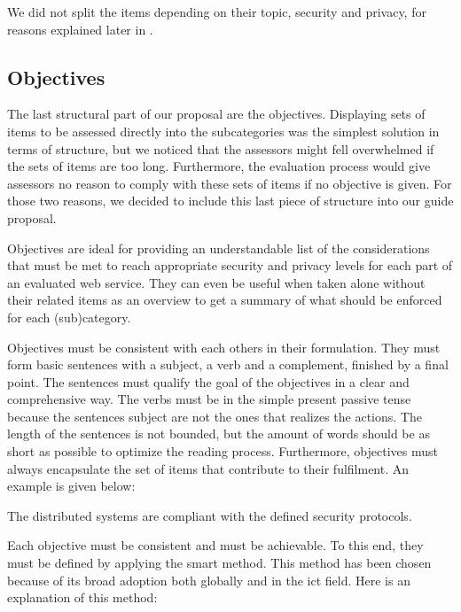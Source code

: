 We did not split the items depending on their topic, security and privacy, for reasons explained later in .

\subsection{Objectives}
\label{subsec:proposal_structure_objectives}

The last structural part of our proposal are the objectives. Displaying sets of items to be assessed directly into the subcategories was the simplest solution in terms of structure, but we noticed that the assessors might fell overwhelmed if the sets of items are too long. Furthermore, the evaluation process would give assessors no reason to comply with these sets of items if no objective is given. For those two reasons, we decided to include this last piece of structure into our guide proposal.

Objectives are ideal for providing an understandable list of the considerations that must be met to reach appropriate security and privacy levels for each part of an evaluated web service. They can even be useful when taken alone without their related items as an overview to get a summary of what should be enforced for each (sub)category.

Objectives must be consistent with each others in their formulation. They must form basic sentences with a subject, a verb and a complement, finished by a final point. The sentences must qualify the goal of the objectives in a clear and comprehensive way. The verbs must be in the simple present passive tense because the sentences subject are not the ones that realizes the actions. The length of the sentences is not bounded, but the amount of words should be as short as possible to optimize the reading process. Furthermore, objectives must always encapsulate the set of items that contribute to their fulfilment. An example is given below:

\begin{center}
	The distributed systems are compliant with the defined security protocols.
\end{center}

Each objective must be consistent and must be achievable. To this end, they must be defined by applying the \gls{smart} method. This method has been chosen because of its broad adoption both globally and in the \gls{ict} field. Here is an explanation of this method:

